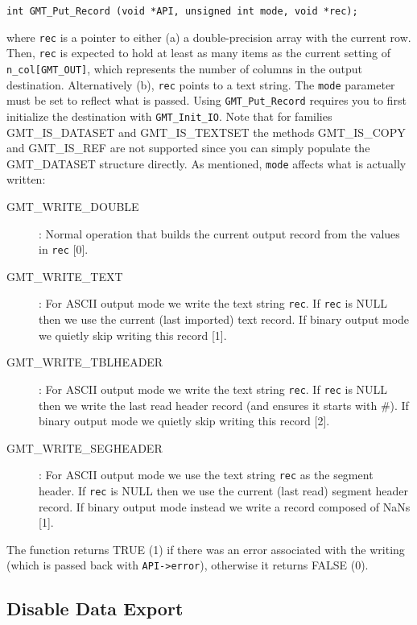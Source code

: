 \documentclass[11pt]{report}
\begin{document}
\begin{verbatim}
int GMT_Put_Record (void *API, unsigned int mode, void *rec);
\end{verbatim}
where \texttt{rec} is a pointer to either (a) a double-precision array with the current row.
Then, \texttt{rec} is expected to hold at least as many items as the current setting of
\texttt{n\_col[GMT\_OUT]}, which represents the number of columns in the output destination.
Alternatively (b), \texttt{rec} points to a text string.
The \texttt{mode} parameter must be set to reflect what is passed.  Using \texttt{GMT\_Put\_Record}
requires you to first initialize the destination with \texttt{GMT\_Init\_IO}.
Note that for families GMT\_IS\_DATASET and GMT\_IS\_TEXTSET the methods GMT\_IS\_COPY and GMT\_IS\_REF are not supported since
you can simply populate the GMT\_DATASET structure directly.
As mentioned, \texttt{mode} affects what is actually written:
\begin{description}
\item [GMT\_WRITE\_DOUBLE]: Normal operation that builds the current output record from
the values in \texttt{rec} [0].
\item [GMT\_WRITE\_TEXT]: For ASCII output mode we write the text string \texttt{rec}.
If \texttt{rec} is NULL then we use the current (last imported) text record.
If binary output mode we quietly skip writing this record [1].
\item [GMT\_WRITE\_TBLHEADER]: For ASCII output mode we write the text string \texttt{rec}.
If \texttt{rec} is NULL then we write the last read
header record (and ensures it starts with \#). If binary output mode we quietly skip writing this record [2].
\item [GMT\_WRITE\_SEGHEADER]: For ASCII output mode we use the text string \texttt{rec} as the segment header.
If \texttt{rec} is NULL then we use the current (last read) segment header record.
If binary output mode instead we write a record composed of NaNs [1].
\end{description}
The function returns TRUE (1) if there was an error associated with the writing (which is passed back with \texttt{API->error}),
otherwise it returns FALSE (0).

\subsection{Disable Data Export}
\end{document}
